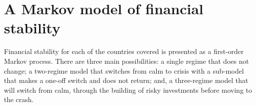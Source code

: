 \documentclass[12pt, a4paper, oneside]{article} %
\begin{document}



\section{A Markov model of financial stability}
Financial stability for each of the countries covered is presented as a first-order Markov process.  There are three main possibilities:  a single regime that does not change; a two-regime model that switches from calm to crisis with a sub-model that makes a one-off switch and does not return; and, a three-regime model that will switch from calm, through the building of risky investments before moving to the crash.  
\end{document}
